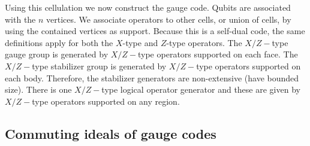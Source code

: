 \documentclass[11pt,oneside]{article}
\begin{document}
Using this cellulation we now construct the gauge code.
Qubits are associated with the $n$ vertices.
We associate operators to other cells, or union of cells,
by using the contained vertices as support.
Because this is a self-dual code, the same definitions apply for
both the $X$-type and $Z$-type operators.
The $X/Z-$type gauge group is generated by
$X/Z-$type operators supported on each face.
The $X/Z-$type stabilizer group is generated by
$X/Z-$type operators supported on each body.
Therefore, the stabilizer generators are non-extensive
(have bounded size).
There is one $X/Z-$type logical operator generator and these
are given by $X/Z-$type operators supported on any region.

\subsection{Commuting ideals of gauge codes}\label{Sec45}
\end{document}
